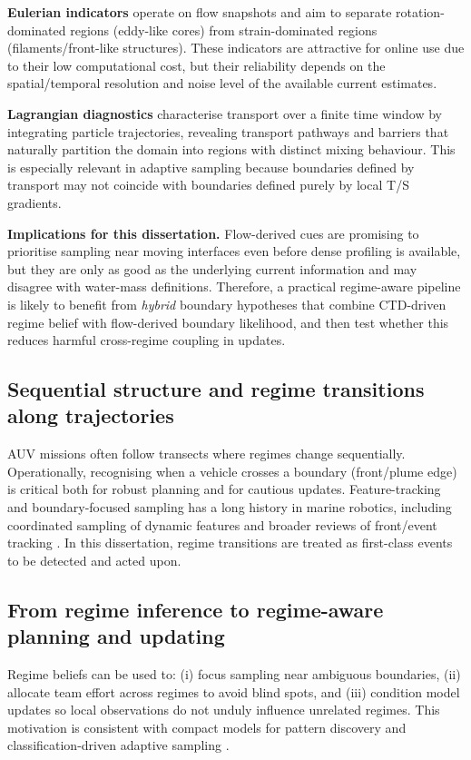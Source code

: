 \textbf{Eulerian indicators} operate on flow snapshots and aim to separate rotation-dominated regions (eddy-like cores)
from strain-dominated regions (filaments/front-like structures). These indicators are attractive for online use due to
their low computational cost, but their reliability depends on the spatial/temporal resolution and noise level of the
available current estimates.

\textbf{Lagrangian diagnostics} characterise transport over a finite time window by integrating particle trajectories,
revealing transport pathways and barriers that naturally partition the domain into regions with distinct mixing behaviour.
This is especially relevant in adaptive sampling because boundaries defined by transport may not coincide with boundaries
defined purely by local T/S gradients.

\textbf{Implications for this dissertation.}
Flow-derived cues are promising to prioritise sampling near moving interfaces even before dense profiling is available,
but they are only as good as the underlying current information and may disagree with water-mass definitions.
Therefore, a practical regime-aware pipeline is likely to benefit from \emph{hybrid} boundary hypotheses that combine
CTD-driven regime belief with flow-derived boundary likelihood, and then test whether this reduces harmful cross-regime
coupling in updates.

 



\subsection{Sequential structure and regime transitions along trajectories}
AUV missions often follow transects where regimes change sequentially. Operationally, recognising when a vehicle crosses a boundary (front/plume edge) is critical both for robust planning and for cautious updates.
Feature-tracking and boundary-focused sampling has a long history in marine robotics, including coordinated sampling of dynamic features \parencite{das2012coordinated} and broader reviews of front/event tracking \parencite{hwang2019auvreview}.
In this dissertation, regime transitions are treated as first-class events to be detected and acted upon.

\subsection{From regime inference to regime-aware planning and updating}
Regime beliefs can be used to: (i) focus sampling near ambiguous boundaries, (ii) allocate team effort across regimes to avoid blind spots, and (iii) condition model updates so local observations do not unduly influence unrelated regimes.
This motivation is consistent with compact models for pattern discovery \parencite{fossum2020compact} and classification-driven adaptive sampling \parencite{ge2023watermasses}.

